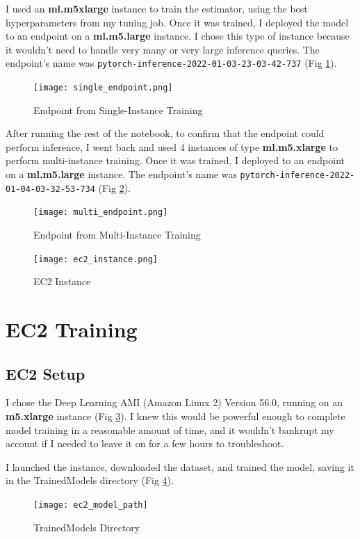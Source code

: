\documentclass[11pt]{amsart}
\begin{document}
I used an \textbf{ml.m5xlarge} instance to train the estimator, using the best hyperparameters from my tuning job. Once it was trained, I deployed the model to an endpoint on a \textbf{ml.m5.large} instance. I chose this type of instance because it wouldn't need to handle very many or very large inference queries. The endpoint's name was \newline\texttt{pytorch-inference-2022-01-03-23-03-42-737} (Fig \ref{fig:single}).
\begin{figure}[t]
\texttt{[image: single\_endpoint.png]}
\caption{Endpoint from Single-Instance Training}
\label{fig:single}
\end{figure}

After running the rest of the notebook, to confirm that the endpoint could perform inference, I went back and used 4 instances of type \textbf{ml.m5.xlarge} to perform multi-instance training. Once it was trained, I deployed to an endpoint on a \textbf{ml.m5.large} instance. The endpoint's name was \texttt{pytorch-inference-2022-01-04-03-32-53-734} (Fig \ref{fig:multi}).
\begin{figure}[h]
\texttt{[image: multi\_endpoint.png]}
\caption{Endpoint from Multi-Instance Training}
\label{fig:multi}
\end{figure}
\begin{figure}[h]
\texttt{[image: ec2\_instance.png]}
\caption{EC2 Instance}
\label{fig:ec2}
\end{figure}

\section{EC2 Training}
\subsection{EC2 Setup}
I chose the Deep Learning AMI (Amazon Linux 2) Version 56.0, running on an \textbf{m5.xlarge} instance (Fig \ref{fig:ec2}). I knew this would be powerful enough to complete model training in a reasonable amount of time, and it wouldn't bankrupt my account if I needed to leave it on for a few hours to troubleshoot.

I launched the instance, downloaded the dataset, and trained the model, saving it in the TrainedModels directory (Fig \ref{fig:dir}).
\begin{figure}[h]
\texttt{[image: ec2\_model\_path]}
\caption{TrainedModels Directory}
\label{fig:dir}
\end{figure}
\end{document}
